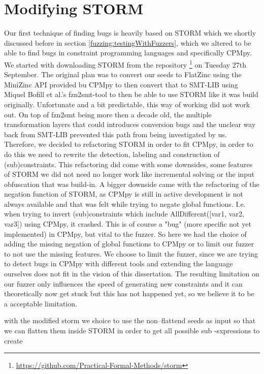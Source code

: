 \section{Modifying STORM}
\label{impl:modifyingSTROM}
Our first technique of finding bugs is heavily based on STORM which we shortly discussed before in section \ref{fuzzing:testingWithFuzzers}, which we altered to be able to find bugs in constraint programming languages and specifically CPMpy. We started with downloading STORM from the repository \footnote{\url{https://github.com/Practical-Formal-Methods/storm}} on Tuesday 27th September.
The original plan was to convert our seeds to FlatZinc using the MiniZinc API provided bu CPMpy to then convert that to SMT-LIB \cite{72bofill2010system} using Miquel Bofill et al.'s fzn2smt-tool to then be able to use STORM like it was build originally. Unfortunate and a bit predictable, this way of working did not work out. On top of fzn2smt being more then a decade old, the multiple transformation layers that could introduces conversion bugs and the unclear way back from SMT-LIB prevented this path from being investigated by us.
Therefore, we decided to refactoring STORM in order to fit CPMpy, in order to do this we need to rewrite the detection, labeling and construction of (sub)constraints. This refactoring did come with some downsides, some features of STORM we did not need no longer work like incremental solving or  the input obfuscation that was build-in. A bigger downside came with the refactoring of the negation function of STORM, as CPMpy is still in active development is not always available and that was felt while trying to negate global functions. I.e. when trying to invert (sub)constraints which include AllDifferent([var1, var2, var3]) using CPMpy, it crashed. This is of course a "bug" (more specific not yet implemented) in CPMpy, but vital to the fuzzer. So here we had the choice of adding the missing negation of global functions to CPMpy or to limit our fuzzer to not use the missing features. We choose to limit the fuzzer, since we are trying to detect bugs in CPMpy with different tools and extending the language ourselves does not fit in the vision of this dissertation. The resulting limitation on our fuzzer only influences the speed of generating new constraints and it can theoretically now get stuck but this has not happened yet, so we believe it to be a acceptable limitation.


with the modified storm we shoice to use the non--flattend seeds as input so that we can flatten them inside STORM in order to get all possible sub -sxpressions to create 

